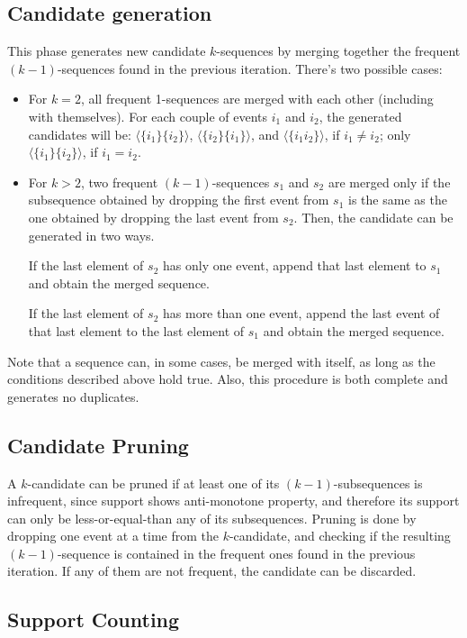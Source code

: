 \subsection{Candidate generation}

This phase generates new candidate $k$-sequences by merging together the frequent $(k-1)$-sequences found in the previous iteration. There's two possible cases: 
\begin{itemize}
    \item For $k = 2$, all frequent 1-sequences are merged with each other (including with themselves). For each couple of events $i_1$ and $i_2$, the generated candidates will be: $\langle\{i_1\} \{i_2\}\rangle$, $\langle\{i_2\} \{i_1\}\rangle$, and $\langle\{i_1 i_2\}\rangle$, if $i_1 \neq i_2$; only $\langle\{i_1\} \{i_2\}\rangle$, if $i_1 = i_2$.

    \item For $k > 2$, two frequent $(k-1)$-sequences $s_1$ and $s_2$ are merged only if the subsequence obtained by dropping the first event from $s_1$ is the same as the one obtained by dropping the last event from $s_2$. Then, the candidate can be generated in two ways. 
    
    If the last element of $s_2$ has only one event, append that last element to $s_1$ and obtain the merged sequence.
    
    If the last element of $s_2$ has more than one event, append the last event of that last element to the last element of $s_1$ and obtain the merged sequence.
\end{itemize}
Note that a sequence can, in some cases, be merged with itself, as long as the conditions described above hold true. Also, this procedure is both complete and generates no duplicates.

\subsection{Candidate Pruning}

A $k$-candidate can be pruned if at least one of its $(k-1)$-subsequences is infrequent, since support shows anti-monotone property, and therefore its support can only be less-or-equal-than any of its subsequences. Pruning is done by dropping one event at a time from the $k$-candidate, and checking if the resulting $(k-1)$-sequence is contained in the frequent ones found in the previous iteration. If any of them are not frequent, the candidate can be discarded.

\subsection{Support Counting}

